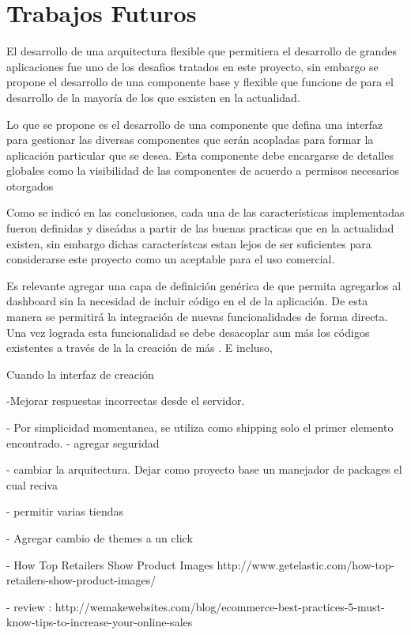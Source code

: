 \chapter{Trabajos Futuros}\label{cap:trabajos_futuros}

	El desarrollo de una arquitectura flexible que permitiera el desarrollo de grandes aplicaciones fue uno de los desafios tratados en este proyecto, sin embargo se propone el desarrollo de una componente base y flexible que funcione de \frameworkPC para el desarrollo de la mayoría de los \websitesINT que esxisten en la actualidad.

	Lo que se propone es el desarrollo de una componente que defina una interfaz para gestionar las diversas componentes que serán acopladas para formar la aplicación particular que se desea. Esta componente \coreAS debe encargarse de detalles globales como la visibilidad de las componentes de acuerdo a permisos necesarios otorgados 

	Como se indicó en las conclusiones, cada una de las características implementadas fueron definidas y diseádas a partir de las buenas practicas que en la actualidad existen, sin embargo dichas característcas estan lejos de ser suficientes para considerarse este proyecto como un \frameworkPC aceptable para el uso comercial. 

	Es relevante agregar una capa de definición genérica de \packagesAS que permita agregarlos al dashboard sin la necesidad de incluir código en el \coreAS de la aplicación. De esta manera se permitirá la integración de nuevas funcionalidades de forma directa. Una vez lograda esta funcionalidad se debe desacoplar aun más los códigos existentes a través de la la creación de más \packagesAS. E incluso, 

	Cuando la interfaz de creación 


-Mejorar respuestas incorrectas desde el servidor.

- Por simplicidad momentanea, se utiliza como shipping solo el primer elemento encontrado.
 - agregar seguridad

 - cambiar la arquitectura. Dejar como proyecto base un manejador de packages el cual reciva

- permitir varias tiendas 

- Agregar cambio de themes a un click


- How Top Retailers Show Product Images
http://www.getelastic.com/how-top-retailers-show-product-images/


- review : 
http://wemakewebsites.com/blog/ecommerce-best-practices-5-must-know-tips-to-increase-your-online-sales


